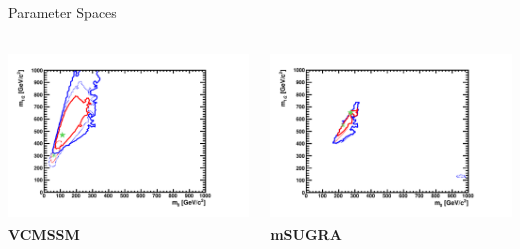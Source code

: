 \documentclass{beamer}
\begin{document}
\begin{frame}{Parameter Spaces}
  \begin{columns}
    \begin{column}{0.5\textwidth}
      \includegraphics[height=4.5cm]{m0m12/vcmssm.pdf}\\
      \textbf{VCMSSM}
    \end{column}
    \begin{column}{0.5\textwidth}
      \includegraphics[height=4.5cm]{m0m12/msugra.pdf}\\
      \textbf{mSUGRA}
    \end{column}
  \end{columns}
\end{frame}
\end{document}
